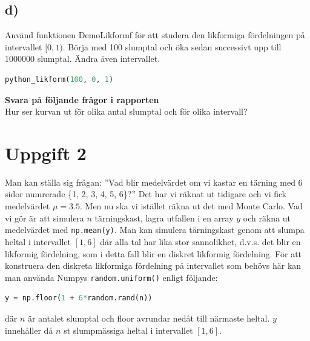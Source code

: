\documentclass[a4paper]{article}
\begin{document}
\subsection{d)}
Använd funktionen DemoLikformf för att studera den likformiga fördelningen på intervallet \([0,1)\).
Börja med 100 slumptal och öka sedan successivt upp till 1000000 slumptal. Ändra även intervallet.

\begin{lstlisting}[language=Python]
    python_likform(100, 0, 1)
\end{lstlisting}

\textbf{Svara på följande frågor i rapporten}\\
Hur ser kurvan ut för olika antal slumptal och för olika intervall?


\newpage
\section{Uppgift 2}
Man kan ställa sig frågan: ”Vad blir medelvärdet om vi kastar en tärning med 6 sidor numrerade \{1, 2, 3, 4, 5, 6\}?”
Det har vi räknat ut tidigare och vi fick medelvärdet \( \mu=3.5 \).
Men nu ska vi istället räkna ut det med Monte Carlo.
Vad vi gör är att simulera \( n \)  tärningskast, lagra utfallen i en array \( y \)
och räkna ut medelvärdet med \lstinline{np.mean(y)}. Man kan simulera tärningskast genom att
slumpa heltal i intervallet \( [1,6] \) där alla tal har lika stor sannolikhet,
d.v.s. det blir en likformig fördelning, som i detta fall blir en diskret likformig fördelning.
För att konstruera den diskreta likformiga fördelning på intervallet som behövs här kan man använda
Numpys \lstinline{random.uniform()} enligt följande:

\begin{lstlisting}[language=Python]
    y = np.floor(1 + 6*random.rand(n))
\end{lstlisting}

där \( n \)  är antalet slumptal och floor avrundar nedåt till närmaste heltal. \( y  \)
innehåller då \( n \)  st slumpmässiga heltal i intervallet $[1,6]$.
\end{document}
